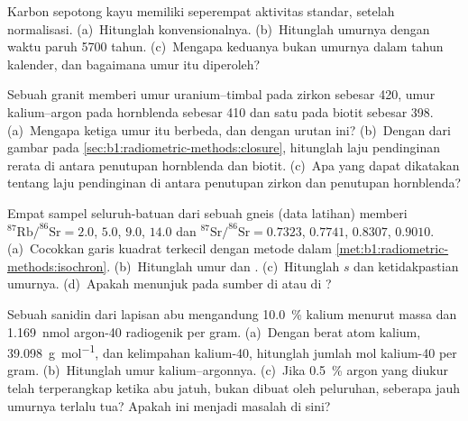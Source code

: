 \begin{exercise}[$\star$]\label{exo:b1:radiometric-methods:3}
Karbon sepotong kayu memiliki seperempat aktivitas standar, setelah normalisasi. (a)~Hitunglah  konvensionalnya. (b)~Hitunglah umurnya dengan waktu paruh \num{5700} tahun. (c)~Mengapa keduanya bukan umurnya dalam tahun kalender, dan bagaimana umur itu diperoleh?
\end{exercise}

\begin{exercise}[$\star$]\label{exo:b1:radiometric-methods:4}
Sebuah granit memberi umur uranium--timbal pada zirkon sebesar \qty{420}{\Ma}, umur kalium--argon pada hornblenda sebesar \qty{410}{\Ma} dan satu pada biotit sebesar \qty{398}{\Ma}. (a)~Mengapa ketiga umur itu berbeda, dan dengan urutan ini? (b)~Dengan  dari gambar pada
\cref{sec:b1:radiometric-methods:closure}, hitunglah laju pendinginan rerata di antara penutupan hornblenda dan biotit. (c)~Apa yang dapat dikatakan tentang laju pendinginan di antara penutupan zirkon dan penutupan hornblenda?
\end{exercise}

\begin{exercise}[$\star\star$]\label{exo:b1:radiometric-methods:5}
Empat sampel seluruh-batuan dari sebuah gneis (data latihan) memberi
$^{87}\mathrm{Rb}/^{86}\mathrm{Sr} = 2.0$, $5.0$, $9.0$, $14.0$ dan
$^{87}\mathrm{Sr}/^{86}\mathrm{Sr} = 0.7323$, $0.7741$, $0.8307$, $0.9010$.
(a)~Cocokkan garis kuadrat terkecil dengan metode dalam \cref{met:b1:radiometric-methods:isochron}. (b)~Hitunglah umur dan . (c)~Hitunglah $s$ dan ketidakpastian umurnya. (d)~Apakah  menunjuk pada sumber di  atau di ?
\end{exercise}

\begin{exercise}[$\star\star$]\label{exo:b1:radiometric-methods:6}
Sebuah sanidin dari lapisan abu mengandung \qty{10.0}{\percent} kalium menurut massa dan \qty{1.169}{nmol} argon-40 radiogenik per gram. (a)~Dengan berat atom kalium, \qty{39.098}{g.mol^{-1}}, dan kelimpahan kalium-40, hitunglah jumlah mol kalium-40 per gram. (b)~Hitunglah umur kalium--argonnya. (c)~Jika \qty{0.5}{\percent} argon yang diukur telah terperangkap ketika abu jatuh, bukan dibuat oleh peluruhan, seberapa jauh umurnya terlalu tua? Apakah ini menjadi masalah di sini?
\end{exercise}

